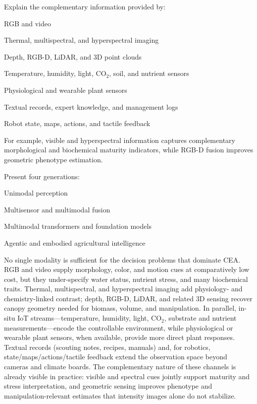 \documentclass[lettersize,journal]{IEEEtran}
\begin{document}
Explain the complementary information provided by:

RGB and video

Thermal, multispectral, and hyperspectral imaging

Depth, RGB-D, LiDAR, and 3D point clouds

Temperature, humidity, light, CO$_2$, soil, and nutrient sensors

Physiological and wearable plant sensors

Textual records, expert knowledge, and management logs

Robot state, maps, actions, and tactile feedback

For example, visible and hyperspectral information captures complementary morphological and biochemical maturity indicators, while RGB-D fusion improves geometric phenotype estimation.

Present four generations:

Unimodal perception

Multisensor and multimodal fusion

Multimodal transformers and foundation models

Agentic and embodied agricultural intelligence

No single modality is sufficient for the decision problems that dominate CEA. RGB and video supply morphology, color, and motion cues at comparatively low cost, but they under-specify water status, nutrient stress, and many biochemical traits. Thermal, multispectral, and hyperspectral imaging add physiology- and chemistry-linked contrast; depth, RGB-D, LiDAR, and related 3D sensing recover canopy geometry needed for biomass, volume, and manipulation. In parallel, in-situ IoT streams---temperature, humidity, light, CO$_2$, substrate and nutrient measurements---encode the controllable environment, while physiological or wearable plant sensors, when available, provide more direct plant responses. Textual records (scouting notes, recipes, manuals) and, for robotics, state/maps/actions/tactile feedback extend the observation space beyond cameras and climate boards. The complementary nature of these channels is already visible in practice: visible and spectral cues jointly support maturity and stress interpretation, and geometric sensing improves phenotype and manipulation-relevant estimates that intensity images alone do not stabilize.
\end{document}

